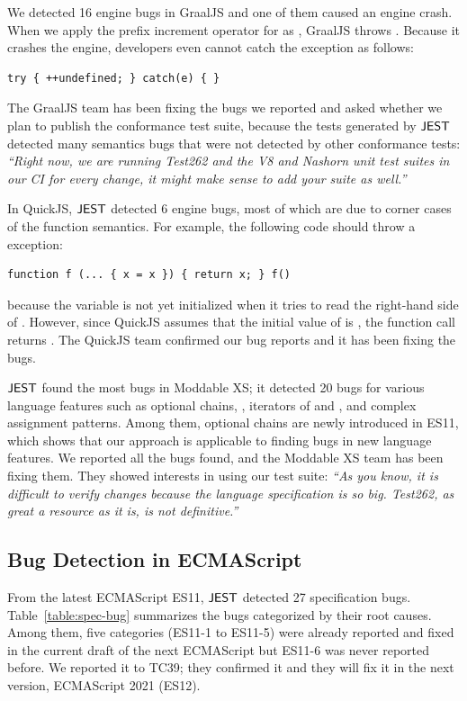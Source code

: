 We detected 16 engine bugs in GraalJS and one of them caused an engine
crash.  When we apply the prefix increment operator for 
as , GraalJS throws .
Because it crashes the engine, developers even cannot catch the exception as follows:
\begin{lstlisting}[style=myJSstyle]
    try { ++undefined; } catch(e) { }
\end{lstlisting}
The GraalJS team has been fixing the bugs we reported and
asked whether we plan to publish the conformance test suite,
because the tests generated by $\tool$ detected many semantics bugs that
were not detected by other conformance tests:
\emph{``Right now, we are running Test262 and the V8 and Nashorn
unit test suites in our CI for every change, it might make sense to
add your suite as well.''}

In QuickJS, $\tool$ detected 6 engine bugs, most of which are due to corner cases of
the function semantics.  For example, the following code should throw
a  exception:
\begin{lstlisting}[style=myJSstyle]
    function f (... { x = x }) { return x; } f()
\end{lstlisting}
because the variable  is not yet initialized when it tries to
read the right-hand side of .
However, since QuickJS assumes that the initial value of  is
, the function call  returns .
The QuickJS team confirmed our bug reports and it has been fixing the bugs.

$\tool$ found the most bugs in Moddable XS; it detected 20 bugs for various
language features such as optional chains, ,
iterators of  and , and complex assignment patterns.
Among them, optional chains are newly introduced in ES11, which shows that
our approach is applicable to finding bugs in new language features.
We reported all the bugs found, and the Moddable XS team has been
fixing them.  They showed interests in using our test suite:
\emph{``As you know, it is difficult to verify changes because the language specification
is so big. Test262, as great a resource as it is, is not definitive.''}

\subsection{Bug Detection in ECMAScript}
From the latest ECMAScript ES11, $\tool$ detected 27 specification bugs.
Table~\ref{table:spec-bug} summarizes the bugs categorized by their root causes.
Among them, five categories (ES11-1 to ES11-5) were already reported and fixed in the current
draft of the next ECMAScript but ES11-6 was never reported before.
We reported it to TC39; they confirmed it and they will
fix it in the next version, ECMAScript 2021 (ES12).

